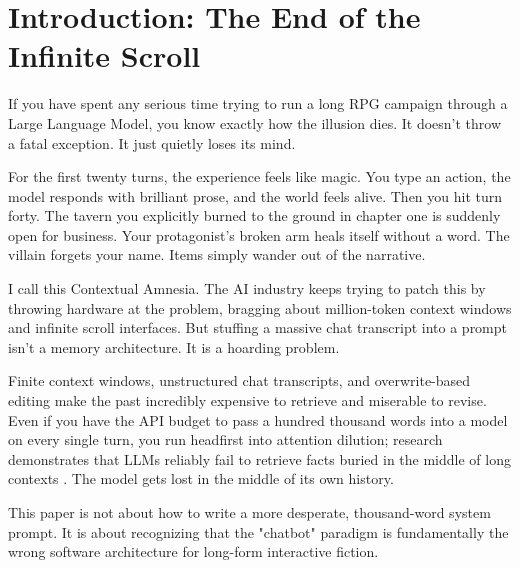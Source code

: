 \documentclass[12pt, a4paper]{article}
\begin{document}
\newpage
\pagestyle{fancy}
\thispagestyle{fancy}
\fancyhf{}
\renewcommand{\sectionmark}[1]{\markboth{#1}{}}
\renewcommand{\subsectionmark}[1]{}
\fancyhead[R]{\footnotesize \nouppercase{\leftmark}}
\renewcommand{\headrulewidth}{0.4pt}



\section{Introduction: The End of the Infinite Scroll}
\label{sec:intro}

If you have spent any serious time trying to run a long RPG campaign through a Large Language Model, you know exactly how the illusion dies. It doesn't throw a fatal exception. It just quietly loses its mind.

For the first twenty turns, the experience feels like magic. You type an action, the model responds with brilliant prose, and the world feels alive. Then you hit turn forty. The tavern you explicitly burned to the ground in chapter one is suddenly open for business. Your protagonist's broken arm heals itself without a word. The villain forgets your name. Items simply wander out of the narrative.

I call this Contextual Amnesia. The AI industry keeps trying to patch this by throwing hardware at the problem, bragging about million-token context windows and infinite scroll interfaces. But stuffing a massive chat transcript into a prompt isn't a memory architecture. It is a hoarding problem. 

Finite context windows, unstructured chat transcripts, and overwrite-based editing make the past incredibly expensive to retrieve and miserable to revise. Even if you have the API budget to pass a hundred thousand words into a model on every single turn, you run headfirst into attention dilution; research demonstrates that LLMs reliably fail to retrieve facts buried in the middle of long contexts \citep{liu2023lost}. The model gets lost in the middle of its own history.

This paper is not about how to write a more desperate, thousand-word system prompt. It is about recognizing that the "chatbot" paradigm is fundamentally the wrong software architecture for long-form interactive fiction.
\end{document}
